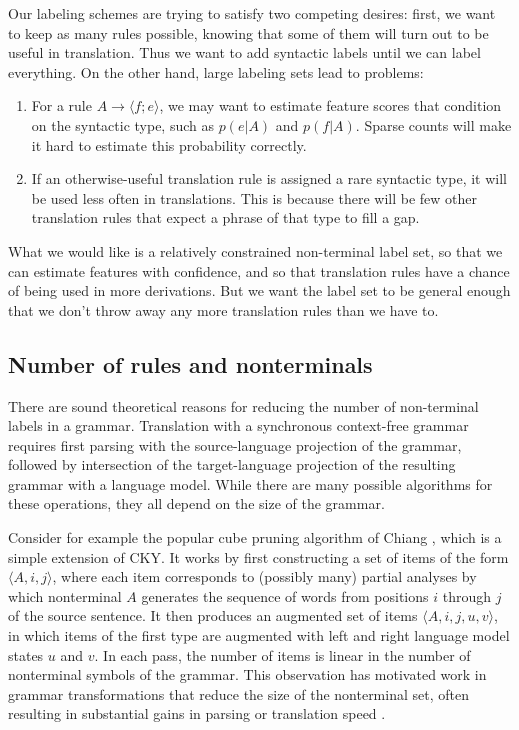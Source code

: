 \documentclass[a4paper]{article}
\begin{document}
Our labeling schemes are trying to satisfy two competing desires: first, we want to keep as many rules possible, knowing that some of them will turn out to be useful in translation. Thus we want to add syntactic labels until we can label everything. On the other hand, large labeling sets lead to problems:
\begin{enumerate}
\item For a rule $A \to \langle f ; e \rangle$, we may want to estimate feature scores that condition on the syntactic type, such as $p(e|A)$ and $p(f|A)$. Sparse counts will make it hard to estimate this probability correctly.
\item If an otherwise-useful translation rule is assigned a rare syntactic type, it will be used less often in translations. This is because there will be few other translation rules that expect a phrase of that type to fill a gap.
\end{enumerate}
What we would like is a relatively constrained non-terminal label set, so that we can estimate features with confidence, and so that translation rules have a chance of being used in more derivations. But we want the label set to be general enough that we don't throw away any more translation rules than we have to.


\subsection{Number of rules and nonterminals}

There are sound theoretical reasons for reducing the number of non-terminal labels in a grammar. Translation with a synchronous context-free grammar requires first parsing with the source-language projection of the grammar, followed by intersection of the target-language projection of the resulting grammar with a language model. While there are many possible algorithms for these operations, they all depend on the size of the grammar.

Consider for example the popular cube pruning algorithm of Chiang
, which is a simple extension of CKY. It works by first
constructing a set of items of the form $\langle A, i, j \rangle$,
where each item corresponds to (possibly many) partial analyses by
which nonterminal $A$ generates the sequence of words from positions
$i$ through $j$ of the source sentence. It then produces an augmented
set of items $\langle A, i, j, u, v \rangle$, in which items of the
first type are augmented with left and right language model states $u$
and $v$. In each pass, the number of items is linear in the number of
nonterminal symbols of the grammar. This observation has motivated
work in grammar transformations that reduce the size of the
nonterminal set, often resulting in substantial gains in parsing or
translation speed \cite{song2008,denero-efficient-parsing,xiao2009}.
\end{document}
